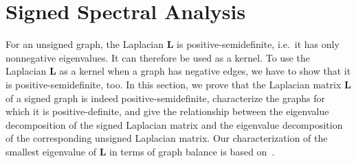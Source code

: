 \documentclass[11pt,a4paper]{book}
\begin{document}
\section{Signed Spectral Analysis}
\label{sec:signed:analysis}
For an unsigned graph, the Laplacian $\mathbf L$ is positive-semidefinite,
i.e.\ it has only nonnegative eigenvalues.  It can 
therefore be used as a kernel.  To use the Laplacian $\mathbf
L$ as a kernel when a graph has negative edges, we have to show that it is
positive-semidefinite, too. 
In this section, we prove that the Laplacian matrix $\mathbf L$ of a
signed graph
is indeed positive-semidefinite, characterize the graphs for which it is
positive-definite, and give the relationship between the eigenvalue
decomposition of the signed Laplacian matrix and the eigenvalue
decomposition of the corresponding unsigned Laplacian matrix.  Our
characterization of the smallest eigenvalue of $\mathbf L$ in
terms of graph balance is based on~\cite{b351}.
\end{document}
